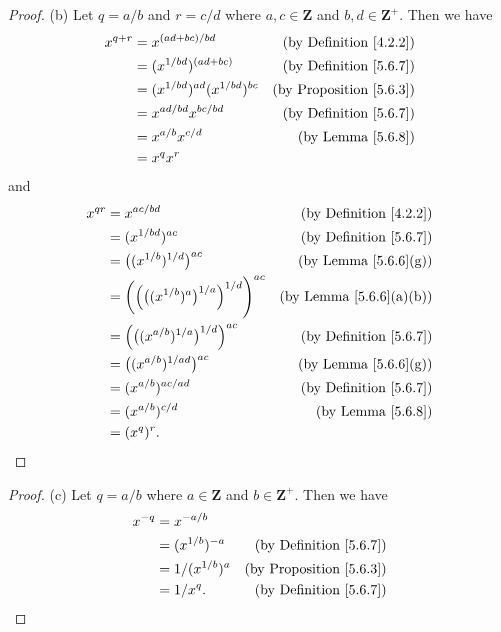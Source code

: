 \begin{proof}{(b)}
    Let \(q = a / b\) and \(r = c / d\) where \(a, c \in \mathbf{Z}\) and \(b, d \in \mathbf{Z}^+\).
    Then we have
    \begin{align*}
        x^{q + r} & = x^{(ad + bc) / bd}                  & \text{(by Definition \ref{4.2.2})}  \\
                  & = (x^{1 / bd})^{(ad + bc)}            & \text{(by Definition \ref{5.6.7})}  \\
                  & = (x^{1 / bd})^{ad} (x^{1 / bd})^{bc} & \text{(by Proposition \ref{5.6.3})} \\
                  & = x^{ad / bd} x^{bc / bd}             & \text{(by  Definition \ref{5.6.7})} \\
                  & = x^{a / b} x^{c / d}                 & \text{(by Lemma \ref{5.6.8})}       \\
                  & = x^q x^r
    \end{align*}
    and
    \begin{align*}
        x^{qr} & = x^{ac / bd}                                                        & \text{(by Definition \ref{4.2.2})}  \\
               & = (x^{1 / bd})^{ac}                                                  & \text{(by Definition \ref{5.6.7})}  \\
               & = \big((x^{1 / b})^{1 / d}\big)^{ac}                                 & \text{(by Lemma \ref{5.6.6}(g))}    \\
               & = \bigg(\Big(\big((x^{1 / b})^a\big)^{1 / a}\Big)^{1 / d}\Bigg)^{ac} & \text{(by Lemma \ref{5.6.6}(a)(b))} \\
               & = \Big(\big((x^{a / b})^{1 / a}\big)^{1 / d}\Big)^{ac}               & \text{(by Definition \ref{5.6.7})}  \\
               & = \big((x^{a / b})^{1 / ad}\big)^{ac}                                & \text{(by Lemma \ref{5.6.6}(g))}    \\
               & = (x^{a / b})^{ac / ad}                                              & \text{(by Definition \ref{5.6.7})}  \\
               & = (x^{a / b})^{c / d}                                                & \text{(by Lemma \ref{5.6.8})}       \\
               & = (x^q)^r.
    \end{align*}
\end{proof}

\begin{proof}{(c)}
    Let \(q = a / b\) where \(a \in \mathbf{Z}\) and \(b \in \mathbf{Z}^+\).
    Then we have
    \begin{align*}
        x^{-q} & = x^{-a / b}                                              \\
               & = (x^{1 / b})^{-a}  & \text{(by Definition \ref{5.6.7})}  \\
               & = 1 / (x^{1 / b})^a & \text{(by Proposition \ref{5.6.3})} \\
               & = 1 / x^q.          & \text{(by Definition \ref{5.6.7})}
    \end{align*}
\end{proof}

